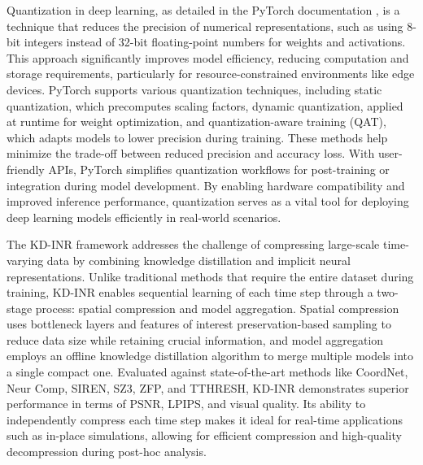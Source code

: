 Quantization in deep learning, as detailed in the PyTorch documentation \cite{pytorchQuantizationx2014}, is a technique that reduces the precision of numerical representations, such as using 8-bit integers instead of 32-bit floating-point numbers for weights and activations. This approach significantly improves model efficiency, reducing computation and storage requirements, particularly for resource-constrained environments like edge devices. PyTorch supports various quantization techniques, including static quantization, which precomputes scaling factors, dynamic quantization, applied at runtime for weight optimization, and quantization-aware training (QAT), which adapts models to lower precision during training. These methods help minimize the trade-off between reduced precision and accuracy loss. With user-friendly APIs, PyTorch simplifies quantization workflows for post-training or integration during model development. By enabling hardware compatibility and improved inference performance, quantization serves as a vital tool for deploying deep learning models efficiently in real-world scenarios.

The KD-INR framework \cite{DBLP:journals/tvcg/HanZB24} addresses the challenge of compressing large-scale time-varying data by combining knowledge distillation and implicit neural representations. Unlike traditional methods that require the entire dataset during training, KD-INR enables sequential learning of each time step through a two-stage process: spatial compression and model aggregation. Spatial compression uses bottleneck layers and features of interest preservation-based sampling to reduce data size while retaining crucial information, and model aggregation employs an offline knowledge distillation algorithm to merge multiple models into a single compact one. Evaluated against state-of-the-art methods like CoordNet, Neur Comp, SIREN, SZ3, ZFP, and TTHRESH, KD-INR demonstrates superior performance in terms of PSNR, LPIPS, and visual quality. Its ability to independently compress each time step makes it ideal for real-time applications such as in-place simulations, allowing for efficient compression and high-quality decompression during post-hoc analysis.

